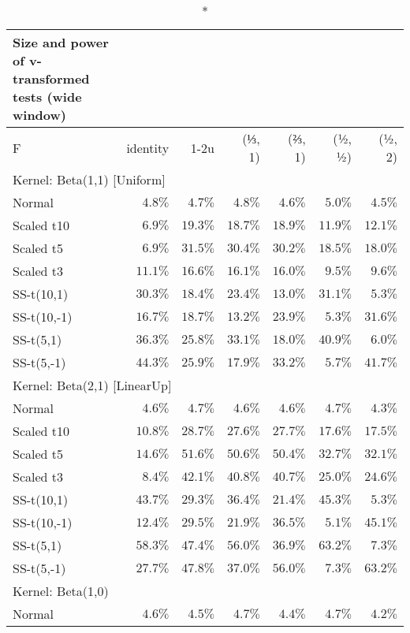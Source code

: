 \setlength{\LTpost}{0mm}
\begin{longtable}{lrrrrrr}
\caption*{
{\large Size and power of v-transformed tests (wide window)}
} \\ 
\toprule
F & identity & \textbar{}1-2u\textbar{} & (⅓, 1) & (⅔, 1) & (½, ½) & (½, 2) \\ 
\midrule
\multicolumn{7}{l}{Kernel: Beta(1,1) [Uniform]} \\ 
\midrule
Normal & $4.8\%$ & $4.7\%$ & $4.8\%$ & $4.6\%$ & $5.0\%$ & $4.5\%$ \\ 
Scaled t10 & $6.9\%$ & $19.3\%$ & $18.7\%$ & $18.9\%$ & $11.9\%$ & $12.1\%$ \\ 
Scaled t5 & $6.9\%$ & $31.5\%$ & $30.4\%$ & $30.2\%$ & $18.5\%$ & $18.0\%$ \\ 
Scaled t3 & $11.1\%$ & $16.6\%$ & $16.1\%$ & $16.0\%$ & $9.5\%$ & $9.6\%$ \\ 
SS-t(10,1) & $30.3\%$ & $18.4\%$ & $23.4\%$ & $13.0\%$ & $31.1\%$ & $5.3\%$ \\ 
SS-t(10,-1) & $16.7\%$ & $18.7\%$ & $13.2\%$ & $23.9\%$ & $5.3\%$ & $31.6\%$ \\ 
SS-t(5,1) & $36.3\%$ & $25.8\%$ & $33.1\%$ & $18.0\%$ & $40.9\%$ & $6.0\%$ \\ 
SS-t(5,-1) & $44.3\%$ & $25.9\%$ & $17.9\%$ & $33.2\%$ & $5.7\%$ & $41.7\%$ \\ 
\midrule
\multicolumn{7}{l}{Kernel: Beta(2,1) [LinearUp]} \\ 
\midrule
Normal & $4.6\%$ & $4.7\%$ & $4.6\%$ & $4.6\%$ & $4.7\%$ & $4.3\%$ \\ 
Scaled t10 & $10.8\%$ & $28.7\%$ & $27.6\%$ & $27.7\%$ & $17.6\%$ & $17.5\%$ \\ 
Scaled t5 & $14.6\%$ & $51.6\%$ & $50.6\%$ & $50.4\%$ & $32.7\%$ & $32.1\%$ \\ 
Scaled t3 & $8.4\%$ & $42.1\%$ & $40.8\%$ & $40.7\%$ & $25.0\%$ & $24.6\%$ \\ 
SS-t(10,1) & $43.7\%$ & $29.3\%$ & $36.4\%$ & $21.4\%$ & $45.3\%$ & $5.3\%$ \\ 
SS-t(10,-1) & $12.4\%$ & $29.5\%$ & $21.9\%$ & $36.5\%$ & $5.1\%$ & $45.1\%$ \\ 
SS-t(5,1) & $58.3\%$ & $47.4\%$ & $56.0\%$ & $36.9\%$ & $63.2\%$ & $7.3\%$ \\ 
SS-t(5,-1) & $27.7\%$ & $47.8\%$ & $37.0\%$ & $56.0\%$ & $7.3\%$ & $63.2\%$ \\ 
\midrule
\multicolumn{7}{l}{Kernel: Beta(1,0)} \\ 
\midrule
Normal & $4.6\%$ & $4.5\%$ & $4.7\%$ & $4.4\%$ & $4.7\%$ & $4.2\%$ \\ 

\end{longtable}
